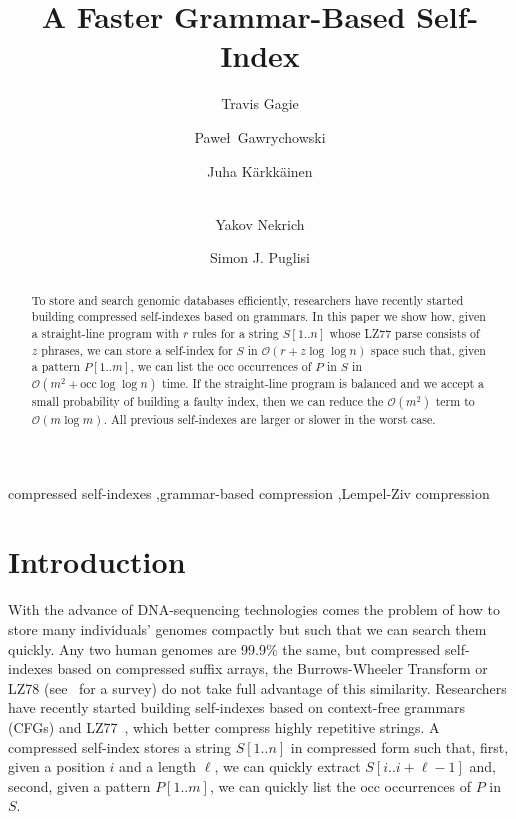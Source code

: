 \documentclass[review]{elsarticle}
\newcommand{\Oh}[1]
    {\ensuremath{\mathcal{O}\!\left( {#1} \right)}}
\newcommand{\occ}
    {\ensuremath{\mathrm{occ}}}
\begin{document}
\begin{frontmatter}

\title{A Faster Grammar-Based Self-Index}

\author[aalto]{Travis Gagie}
\author[mpi]{Pawe\l\ Gawrychowski}
\author[helsinki]{Juha K\"arkk\"ainen}
\author[chile]{\\Yakov Nekrich}
\author[helsinki]{Simon J. Puglisi}
\address[aalto]{Aalto University}
\address[mpi]{Max Planck Institute}
\address[helsinki]{University of Helsinki}
\address[chile]{University of Chile}

\begin{abstract}
To store and search genomic databases efficiently, researchers have recently started building compressed self-indexes based on grammars.  In this paper we show how, given a straight-line program with $r$ rules for a string \(S [1..n]\) whose LZ77 parse consists of $z$ phrases, we can store a self-index for $S$ in $\Oh{r + z \log \log n}$ space such that, given a pattern \(P [1..m]\), we can list the $\occ$ occurrences of $P$ in $S$ in $\Oh{m^2 + \occ \log \log n}$ time.  If the straight-line program is balanced and we accept a small probability of building a faulty index, then we can reduce the $\Oh{m^2}$ term to $\Oh{m \log m}$.  All previous self-indexes are larger or slower in the worst case.
\end{abstract}

\begin{keyword}
compressed self-indexes \sep grammar-based compression \sep Lempel-Ziv compression
\end{keyword}

\end{frontmatter}

\section{Introduction} \label{sec:intro}

With the advance of DNA-sequencing technologies comes the problem of how to store many individuals' genomes compactly but such that we can search them quickly.  Any two human genomes are 99.9\% the same, but compressed self-indexes based on compressed suffix arrays, the Burrows-Wheeler Transform or LZ78 (see~\cite{NM07} for a survey) do not take full advantage of this similarity.  Researchers have recently started building self-indexes based on context-free grammars (CFGs) and LZ77~\cite{ZL77}, which better compress highly repetitive strings.  A compressed self-index stores a string \(S [1..n]\) in compressed form such that, first, given a position $i$ and a length $\ell$, we can quickly extract \(S [i..i + \ell - 1]\) and, second, given a pattern \(P [1..m]\), we can quickly list the $\occ$ occurrences of $P$ in $S$.
\end{document}

